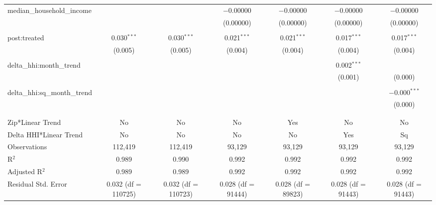 \begin{table}[H]
{\begin{tabular}{@{\extracolsep{5pt}}lcccccc}
  median\_household\_income &  &  & $-$0.00000 & $-$0.00000 & $-$0.00000 & $-$0.00000 \\  

   &  &  & (0.00000) & (0.00000) & (0.00000) & (0.00000) \\  

   & & & & & & \\  

  post:treated & 0.030$^{***}$ & 0.030$^{***}$ & 0.021$^{***}$ & 0.021$^{***}$ & 0.017$^{***}$ & 0.017$^{***}$ \\  

   & (0.005) & (0.005) & (0.004) & (0.004) & (0.004) & (0.004) \\  

   & & & & & & \\  

  delta\_hhi:month\_trend &  &  &  &  & 0.002$^{***}$ &  \\  

   &  &  &  &  & (0.001) & (0.000) \\  

   & & & & & & \\  

  delta\_hhi:sq\_month\_trend &  &  &  &  &  & $-$0.000$^{***}$ \\  

   &  &  &  &  &  & (0.000) \\  

   & & & & & & \\  

 \hline \\[-1.8ex]  

 Zip*Linear Trend & No & No & No & Yes & No & No \\  

 Delta HHI*Linear Trend & No & No & No & No & Yes & Sq \\  

 Observations & 112,419 & 112,419 & 93,129 & 93,129 & 93,129 & 93,129 \\  

 R$^{2}$ & 0.989 & 0.990 & 0.992 & 0.992 & 0.992 & 0.992 \\  

 Adjusted R$^{2}$ & 0.989 & 0.989 & 0.992 & 0.992 & 0.992 & 0.992 \\  

 Residual Std. Error & 0.032 (df = 110725) & 0.032 (df = 110723) & 0.028 (df = 91444) & 0.028 (df = 89823) & 0.028 (df = 91443) & 0.028 (df = 91443) \\  


\end{tabular}}
\end{table}
